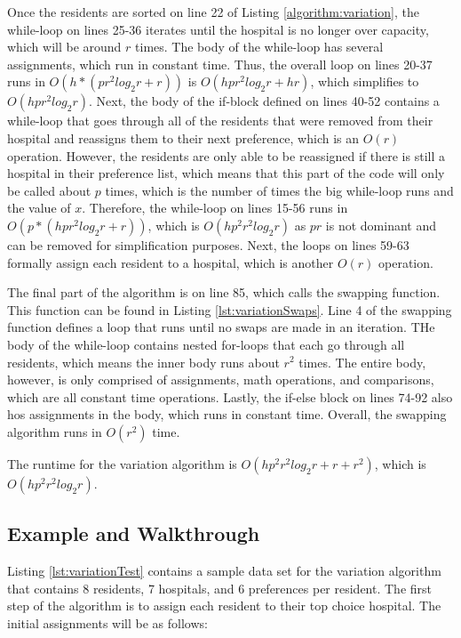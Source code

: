 \documentclass[letterpaper, 10pt,DIV=13]{scrartcl}
\numberwithin{equation}{section} %
\numberwithin{figure}{section} %
\numberwithin{table}{section} %
\begin{document}
Once the residents are sorted on line 22 of Listing \ref{algorithm:variation}, the while-loop on lines 25-36 iterates until the hospital is no longer over capacity, which will be around $r$ times. The body of the while-loop has several assignments, which run in constant time. Thus, the overall loop on lines 20-37 runs in $O(h * (pr^2log_2r + r))$ is $O(hpr^2log_2r + hr)$, which simplifies to $O(hpr^2log_2r)$. Next, the body of the if-block defined on lines 40-52 contains a while-loop that goes through all of the residents that were removed from their hospital and reassigns them to their next preference, which is an $O(r)$ operation. However, the residents are only able to be reassigned if there is still a hospital in their preference list, which means that this part of the code will only be called about $p$ times, which is the number of times the big while-loop runs and the value of $x$. Therefore, the while-loop on lines 15-56 runs in $O(p *(hpr^2log_2r + r))$, which is $O(hp^2r^2log_2r)$ as $pr$ is not dominant and can be removed for simplification purposes. Next, the loops on lines 59-63 formally assign each resident to a hospital, which is another $O(r)$ operation.

The final part of the algorithm is on line 85, which calls the swapping function. This function can be found in Listing \ref{lst:variationSwaps}. Line 4 of the swapping function defines a loop that runs until no swaps are made in an iteration. THe body of the while-loop contains nested for-loops that each go through all residents, which means the inner body runs about $r^2$ times. The entire body, however, is only comprised of assignments, math operations, and comparisons, which are all constant time operations. Lastly, the if-else block on lines 74-92 also hos assignments in the body, which runs in constant time. Overall, the swapping algorithm runs in $O(r^2)$ time.

The runtime for the variation algorithm is $O(hp^2r^2log_2r + r + r^2)$, which is $O(hp^2r^2log_2r)$.

\subsection{Example and Walkthrough}
Listing \ref{lst:variationTest} contains a sample data set for the variation algorithm that contains 8 residents, 7 hospitals, and 6 preferences per resident. The first step of the algorithm is to assign each resident to their top choice hospital. The initial assignments will be as follows:
\end{document}
